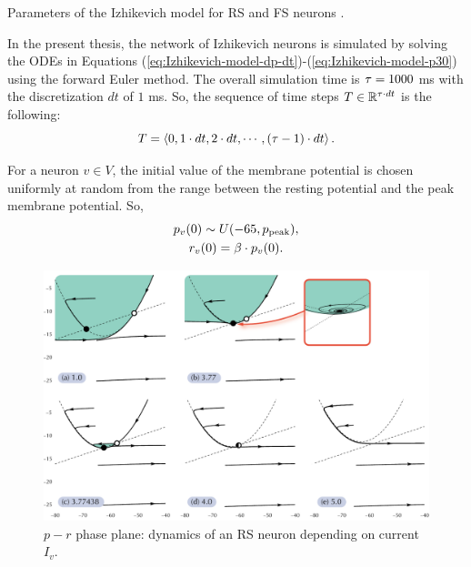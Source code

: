 \begin{table}[!htp] 
    \centering
    
    \caption[Izhikevich parameters: RS and FS neurons]{Parameters of the Izhikevich model for RS and FS neurons \cite{Izhikevich2003}.}
\label{tab:params-izhikevich-model}
\end{table}


In the present thesis, the network of Izhikevich neurons is simulated by solving the ODEs in Equations (\ref{eq:Izhikevich-model-dp-dt})-(\ref{eq:Izhikevich-model-p30}) using the forward Euler method. The overall simulation time is $\tau = 1000$ ms with the discretization $dt$ of $1$ ms. So, the sequence of time steps $T \in \mathbb{R}^{\tau \cdot dt}$ is the following:
\begin{equation}
    T = \left<
        0, 1 \cdot dt, 2 \cdot dt, \cdots, (\tau-1) \cdot dt
    \right>.
\end{equation}

For a neuron $v \in V$, the initial value of the membrane potential is chosen uniformly at random from the range between the resting potential and the peak membrane potential. So, 
\begin{equation}
\begin{gathered}
    p_v(0) \sim U(-65, p_{\mathrm{peak}}), \\
    r_v(0) = \beta \cdot p_v(0).
\end{gathered}
\end{equation}

\begin{figure}[!htp]
    \centering
    \includegraphics[width=\textwidth]{src/assets/images/neural-dynamics/nd-rs.pdf}
    \caption[Dynamics of an RS neuron]{$p-r$ phase plane: dynamics of an RS neuron depending on current $I_v$.}
    \label{fig:neural-dynamics-rs}
\end{figure}

